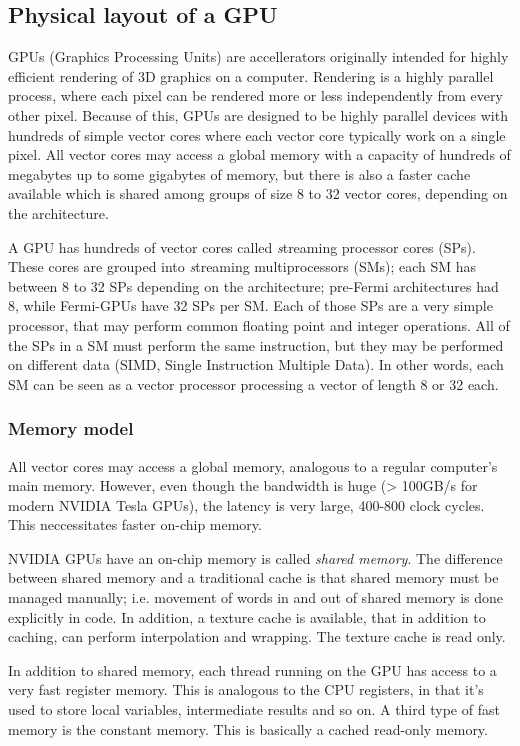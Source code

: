 \subsection{Physical layout of a GPU}
GPUs (Graphics Processing Units) are accellerators originally intended for highly efficient rendering of 3D graphics on a computer. Rendering is a highly parallel process, where each pixel can be rendered more or less independently from every other pixel. Because of this, GPUs are designed to be highly parallel devices with hundreds of simple vector cores where each vector core typically work on a single pixel. All vector cores may access a global memory with a capacity of hundreds of megabytes up to some gigabytes of memory, but there is also a faster cache available which is shared among groups of size 8 to 32 vector cores, depending on the architecture.

A GPU has hundreds of vector cores called {\textit streaming processor cores} (SPs). These cores are grouped into {\textit streaming multiprocessors} (SMs); each SM has between 8 to 32 SPs depending on the architecture; pre-Fermi architectures had 8, while Fermi-GPUs have 32 SPs per SM. Each of those SPs are a very simple processor, that may perform common floating point and integer operations. All of the SPs in a SM must perform the same instruction, but they may be performed on different data (SIMD, Single Instruction Multiple Data). In other words, each SM can be seen as a vector processor processing a vector of length 8 or 32 each. 

\subsubsection{Memory model}
All vector cores may access a global memory, analogous to a regular computer's main memory. However, even though the bandwidth is huge (> 100GB/s for modern NVIDIA Tesla GPUs)\cite{tesla2070product}, the latency is very large, 400-800 clock cycles.\cite[p. 87]{cudaprogguide} This neccessitates faster on-chip memory. 

NVIDIA GPUs have an on-chip memory is called \textit{shared memory}. The difference between shared memory and a traditional cache is that shared memory must be managed manually; i.e. movement of words in and out of shared memory is done explicitly in code. In addition, a texture cache is available, that in addition to caching, can perform interpolation and wrapping. The texture cache is read only.

In addition to shared memory, each thread running on the GPU has access to a very fast register memory. This is analogous to the CPU registers, in that it's used to store local variables, intermediate results and so on. A third type of fast memory is the constant memory. This is basically a cached read-only memory.

